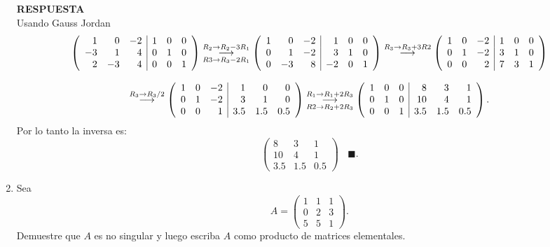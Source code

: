 \documentclass[11pt,letterpaper]{article}
\newcommand{\res}{\textbf{RESPUESTA}\\}
\newcommand{\finf}{\blacksquare.}
\newcommand{\grstep}[2][\relax]{%
   \ensuremath{\mathrel{
       {\mathop{\longrightarrow}\limits^{#2\mathstrut}_{
                                     \begin{subarray}{l} #1 \end{subarray}}}}}}
\begin{document}
\begin{enumerate}
\res
Usando Gauss Jordan
\begin{equation*}
\begin{array}{c}
\left(\begin{array}{rrr|rrr}
 1 &  0 & -2 & 1 & 0 & 0 \\
-3 &  1 &  4 & 0 & 1 & 0\\
 2 & -3 &  4 & 0 & 0 & 1
\end{array}\right)%
\grstep[R3 \rightarrow R_3 -2R_1]{R_2 \rightarrow R_2 -3R_1}
%
\left(\begin{array}{rrr|rrr}
 1 &  0 & -2 &  1 & 0 & 0\\
 0 &  1 & -2 &  3 & 1 & 0\\
 0 & -3 &  8 & -2 & 0 & 1 
\end{array}\right)%
\grstep[]{R_3 \rightarrow R_3+3R2}
%
\left(\begin{array}{rrr|rrr}
 1 &  0 & -2 &  1 & 0 & 0\\
 0 &  1 & -2 &  3 & 1 & 0\\
 0 &  0 &  2 &  7 & 3 & 1 
\end{array}\right)\\
\\
%
\grstep[]{R_3 \rightarrow R_3/2}
% 
\left(\begin{array}{rrr|rrr}
 1 &  0 & -2 &  1 & 0 & 0\\
 0 &  1 & -2 &  3 & 1 & 0\\
 0 &  0 &  1 &  3.5 & 1.5 & 0.5 
\end{array}\right)%
\grstep[R2 \rightarrow R_2+2R_3]{R_1 \rightarrow R_1+2R_3}
%
\left(\begin{array}{rrr|rrr}
 1 &  0 & 0 &  8 & 3 & 1\\
 0 &  1 & 0 &  10 & 4 & 1\\
 0 &  0 & 1 &  3.5 & 1.5 & 0.5 
\end{array}\right).
\end{array}
\end{equation*}
Por lo tanto la inversa es: 
\begin{equation*}
\begin{pmatrix}
8 & 3 & 1 \\
10 & 4 & 1 \\
3.5 & 1.5 & 0.5
\end{pmatrix} \ \ \ \ \finf
\end{equation*}
\item Sea 
\begin{equation*}
A=\left(\begin{array}{rrr}
 1 & 1 & 1\\
 0 & 2 & 3\\
 5 & 5 & 1
\end{array}\right).
\end{equation*}
Demuestre que $A$ es no singular y luego escriba $A$ como producto de matrices elementales.


\end{enumerate}
\end{document}
